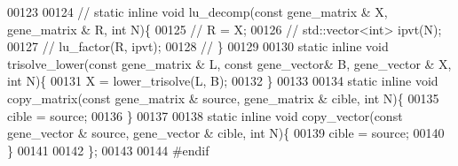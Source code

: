\begin{DoxyCode}
00123 
00124 \textcolor{comment}{//   static inline void lu\_decomp(const gene\_matrix & X, gene\_matrix & R, int N)\{}
00125 \textcolor{comment}{//     R = X;}
00126 \textcolor{comment}{//     std::vector<int> ipvt(N);}
00127 \textcolor{comment}{//     lu\_factor(R, ipvt);}
00128 \textcolor{comment}{//   \}}
00129 
00130   \textcolor{keyword}{static} \textcolor{keyword}{inline} \textcolor{keywordtype}{void} trisolve\_lower(\textcolor{keyword}{const} gene\_matrix & L, \textcolor{keyword}{const} gene\_vector& B, gene\_vector & X, \textcolor{keywordtype}{int} N)\{
00131     X = lower\_trisolve(L, B);
00132   \}
00133 
00134   \textcolor{keyword}{static} \textcolor{keyword}{inline} \textcolor{keywordtype}{void} copy\_matrix(\textcolor{keyword}{const} gene\_matrix & source, gene\_matrix & cible, \textcolor{keywordtype}{int} N)\{
00135     cible = source;
00136   \}
00137 
00138   \textcolor{keyword}{static} \textcolor{keyword}{inline} \textcolor{keywordtype}{void} copy\_vector(\textcolor{keyword}{const} gene\_vector & source, gene\_vector & cible, \textcolor{keywordtype}{int} N)\{
00139     cible = source;
00140   \}
00141 
00142 \};
00143 
00144 \textcolor{preprocessor}{#endif}
\end{DoxyCode}
